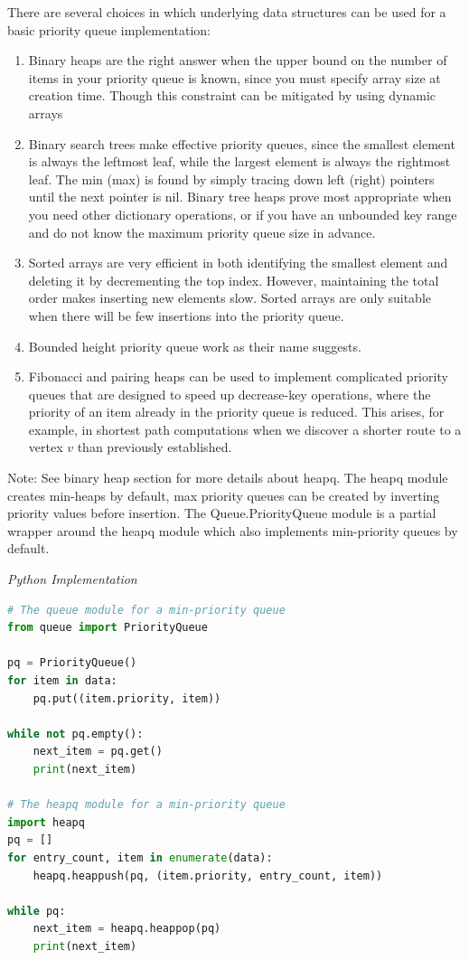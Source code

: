 \documentclass{article}
\begin{document}
    There are several choices in which underlying data structures can be used for a basic priority queue implementation:
    \begin{enumerate}
        \item Binary heaps are the right answer when the upper bound on the number of items in your priority queue is known, since you must specify array size at creation time. Though this constraint can be mitigated by using dynamic arrays
    
        \item Binary search trees make effective priority queues, since the smallest element is always the leftmost leaf, while the largest element is always the rightmost leaf. The min (max) is found by simply tracing down left (right) pointers until the next pointer is nil. Binary tree heaps prove most appropriate when you need other dictionary operations, or if you have an unbounded key range and do not know the maximum priority queue size in advance.
        
        \item Sorted arrays are very efficient in both identifying the smallest element and deleting it by decrementing the top index. However, maintaining the total order makes inserting new elements slow. Sorted arrays are only suitable when there will be few insertions into the priority queue.
        
        \item Bounded height priority queue work as their name suggests.
        
        \item Fibonacci and pairing heaps can be used to implement complicated priority queues that are designed to speed up decrease-key operations, where the priority of an item already in the priority queue is reduced. This arises, for example, in shortest path computations when we discover a shorter route to a vertex $v$ than previously established.
    \end{enumerate}
    
    Note: See binary heap section for more details about heapq. The heapq module creates min-heaps by default, max priority queues can be created by inverting priority values before insertion. The Queue.PriorityQueue module is a partial wrapper around the heapq module which also implements min-priority queues by default. 
    
\vspace{8pt} \emph{Python Implementation}
\begin{lstlisting}[language=Python]
# The queue module for a min-priority queue
from queue import PriorityQueue

pq = PriorityQueue()
for item in data:
    pq.put((item.priority, item))

while not pq.empty():
    next_item = pq.get()
    print(next_item)
    
# The heapq module for a min-priority queue
import heapq
pq = []
for entry_count, item in enumerate(data):
    heapq.heappush(pq, (item.priority, entry_count, item))
    
while pq:
    next_item = heapq.heappop(pq)
    print(next_item)
\end{lstlisting}
\end{document}
